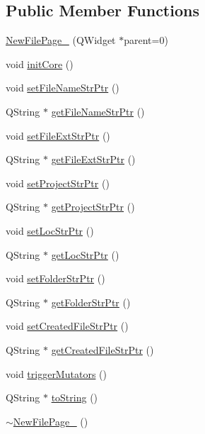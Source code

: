 \subsection*{Public Member Functions}
\begin{DoxyCompactItemize}
\item 
\hyperlink{class_new_file_page__4_aa11280d055e26091b50b63efcea85937}{New\-File\-Page\-\_} (Q\-Widget $\ast$parent=0)
\item 
void \hyperlink{class_new_file_page__4_a2dc94af0431a9b2c38809cbfaecdfb4b}{init\-Core} ()
\item 
void \hyperlink{class_new_file_page__4_a42933a07b4d1a56f42d52244ab57f81a}{set\-File\-Name\-Str\-Ptr} ()
\item 
Q\-String $\ast$ \hyperlink{class_new_file_page__4_a363fb54f9805b1ca929716110eb3d6b5}{get\-File\-Name\-Str\-Ptr} ()
\item 
void \hyperlink{class_new_file_page__4_ad50df188d5e7b1e6865dadbae1acc518}{set\-File\-Ext\-Str\-Ptr} ()
\item 
Q\-String $\ast$ \hyperlink{class_new_file_page__4_ae52c86fc85a030d00bd614e6b80976f2}{get\-File\-Ext\-Str\-Ptr} ()
\item 
void \hyperlink{class_new_file_page__4_a697c7546c4530ca898d15d6a1b7a862f}{set\-Project\-Str\-Ptr} ()
\item 
Q\-String $\ast$ \hyperlink{class_new_file_page__4_a401de061c0e91f35fcb6c071242a6f05}{get\-Project\-Str\-Ptr} ()
\item 
void \hyperlink{class_new_file_page__4_a91db2de63f481e2a95e0198ec77ec3db}{set\-Loc\-Str\-Ptr} ()
\item 
Q\-String $\ast$ \hyperlink{class_new_file_page__4_a93d61b47197748a489d45c751ae50800}{get\-Loc\-Str\-Ptr} ()
\item 
void \hyperlink{class_new_file_page__4_a0a525af0cbf467308a73626aefef8d25}{set\-Folder\-Str\-Ptr} ()
\item 
Q\-String $\ast$ \hyperlink{class_new_file_page__4_a0a4e7f833f62804c8b6e5dd1d686fa54}{get\-Folder\-Str\-Ptr} ()
\item 
void \hyperlink{class_new_file_page__4_aa0c4287cae62cede06c2e2a7d9c0dd6e}{set\-Created\-File\-Str\-Ptr} ()
\item 
Q\-String $\ast$ \hyperlink{class_new_file_page__4_a32889631620e361e55dede29fe9ddafe}{get\-Created\-File\-Str\-Ptr} ()
\item 
void \hyperlink{class_new_file_page__4_af591f310af80bc072af9739f14a7a9cf}{trigger\-Mutators} ()
\item 
Q\-String $\ast$ \hyperlink{class_new_file_page__4_ae68d2afd12efd7449acdeb94af79cda1}{to\-String} ()
\item 
\hyperlink{class_new_file_page__4_a703b2a4c001a153f243f1b2c3967be6f}{$\sim$\-New\-File\-Page\-\_} ()
\end{DoxyCompactItemize}
